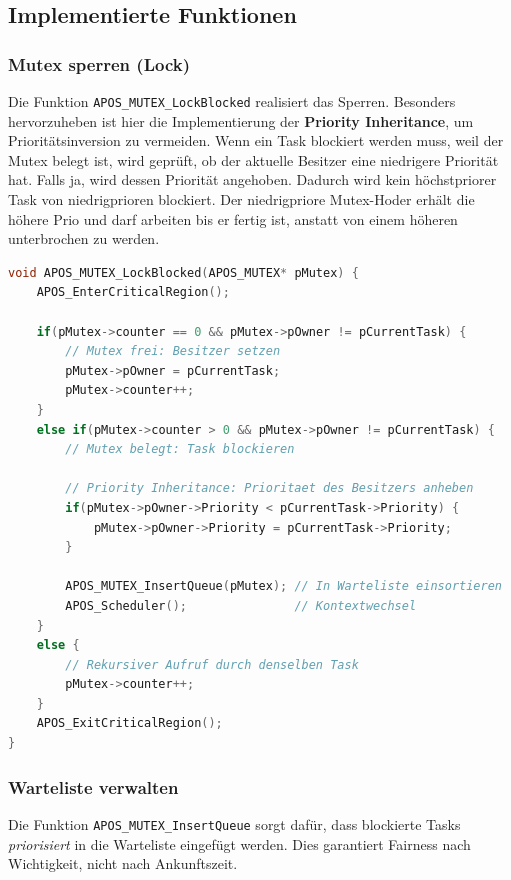 \documentclass[12pt,naustrian,a4widepaper]{scrartcl}
\begin{document}
\subsection*{Implementierte Funktionen}

\subsubsection*{Mutex sperren (Lock)}
Die Funktion \texttt{APOS\_MUTEX\_LockBlocked} realisiert das Sperren.
Besonders hervorzuheben ist hier die Implementierung der \textbf{Priority Inheritance}, um Prioritätsinversion zu vermeiden.
Wenn ein Task blockiert werden muss, weil der Mutex belegt ist, wird geprüft, ob der aktuelle Besitzer eine niedrigere Priorität hat.
Falls ja, wird dessen Priorität angehoben.
Dadurch wird kein höchstpriorer Task von niedrigprioren blockiert.
Der niedrigpriore Mutex-Hoder erhält die höhere Prio und darf arbeiten bis er fertig ist, anstatt von einem höheren unterbrochen zu werden.
\clearpage

\begin{lstlisting}[language=C, caption={Ausschnitt aus APOS\_MUTEX\_LockBlocked}]
void APOS_MUTEX_LockBlocked(APOS_MUTEX* pMutex) {
    APOS_EnterCriticalRegion();

    if(pMutex->counter == 0 && pMutex->pOwner != pCurrentTask) {
        // Mutex frei: Besitzer setzen
        pMutex->pOwner = pCurrentTask;
        pMutex->counter++;
    }
    else if(pMutex->counter > 0 && pMutex->pOwner != pCurrentTask) {
        // Mutex belegt: Task blockieren
        
        // Priority Inheritance: Prioritaet des Besitzers anheben
        if(pMutex->pOwner->Priority < pCurrentTask->Priority) {
            pMutex->pOwner->Priority = pCurrentTask->Priority;
        }

        APOS_MUTEX_InsertQueue(pMutex); // In Warteliste einsortieren
        APOS_Scheduler();               // Kontextwechsel
    }
    else {
        // Rekursiver Aufruf durch denselben Task
        pMutex->counter++;
    }
    APOS_ExitCriticalRegion();
}
\end{lstlisting}

\subsubsection*{Warteliste verwalten}
Die Funktion \texttt{APOS\_MUTEX\_InsertQueue} sorgt dafür, dass blockierte Tasks \textit{priorisiert} in die Warteliste eingefügt werden.
Dies garantiert Fairness nach Wichtigkeit, nicht nach Ankunftszeit.
\end{document}
